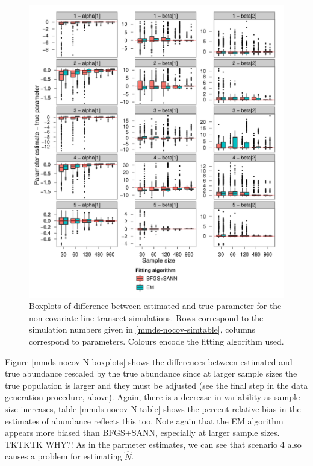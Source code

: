 \begin{figure}[hp]
\centering
\includegraphics[width=7in]{mix/figs/nocov-boxplots.pdf}
\caption{Boxplots of difference between estimated and true parameter for the non-covariate line transect simulations. Rows correspond to the simulation numbers given in \ref{mmds-nocov-simtable}, columns correspond to parameters. Colours encode the fitting algorithm used.}
\label{mmds-nocov-boxplots}
\end{figure}

Figure \ref{mmds-nocov-N-boxplots} shows the differences between estimated and true abundance rescaled by the true abundance since at larger sample sizes the true population is larger and they must be adjusted (see the final step in the data generation procedure, above). Again, there is a decrease in variability as sample size increases, table \ref{mmds-nocov-N-table} shows the percent relative bias in the estimates of abundance reflects this too. Note again that the EM algorithm appears more biased than BFGS+SANN, especially at larger sample sizes. TKTKTK WHY?! As in the parmeter estimates, we can see that scenario 4 also causes a problem for estimating $\hat{N}$.

